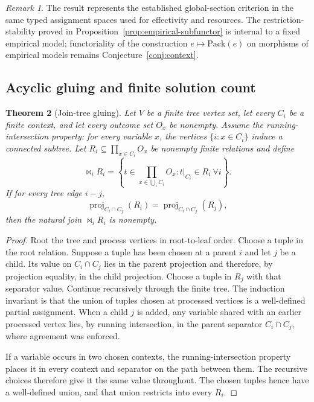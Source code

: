 \documentclass[11pt]{article}
\theoremstyle{plain}
\newtheorem{theorem}{Theorem}[section]
\theoremstyle{definition}
\theoremstyle{remark}
\newtheorem{remark}[theorem]{Remark}
\begin{document}
\begin{remark}
The result represents the established global-section criterion in the same typed
assignment spaces used for effectivity and resources. The restriction-stability
proved in Proposition~\ref{prop:empirical-subfunctor} is internal to a fixed empirical model; functoriality of the
construction $e\mapsto\mathrm{Pack}(e)$ on morphisms of empirical models remains
Conjecture~\ref{conj:context}.
\end{remark}

\subsection{Acyclic gluing and finite solution count}

\begin{theorem}[Join-tree gluing]\label{thm:jointree}
Let $V$ be a finite tree vertex set, let every $C_i$ be a finite context, and
let every outcome set $O_x$ be nonempty. Assume the running-intersection
property: for every variable $x$, the vertices $\{i:x\in C_i\}$ induce a
connected subtree. Let $R_i\subseteq\prod_{x\in C_i}O_x$ be nonempty finite
relations and define
\[
\Join_iR_i=
\left\{t\in\prod_{x\in\bigcup_iC_i}O_x:
 t|_{C_i}\in R_i\ \forall i\right\}.
\]
If for every tree edge $i{-}j$,
\[
\operatorname{proj}_{C_i\cap C_j}(R_i)
=
\operatorname{proj}_{C_i\cap C_j}(R_j),
\]
then the natural join $\Join_iR_i$ is nonempty.
\end{theorem}

\begin{proof}
Root the tree and process vertices in root-to-leaf order. Choose a tuple in the
root relation. Suppose a tuple has been chosen at a parent $i$ and let $j$ be a
child. Its value on
$C_i\cap C_j$ lies in the parent projection and therefore, by projection
equality, in the child projection. Choose a tuple in $R_j$ with that separator
value. Continue recursively through the finite tree. The induction invariant is that
the union of tuples chosen at processed vertices is a well-defined partial
assignment. When a child $j$ is added, any variable shared with an earlier
processed vertex lies, by running intersection, in the parent separator
$C_i\cap C_j$, where agreement was enforced.

If a variable occurs in two chosen contexts, the running-intersection property
places it in every context and separator on the path between them. The recursive
choices therefore give it the same value throughout. The chosen tuples hence
have a well-defined union, and that union restricts into every $R_i$.
\end{proof}
\end{document}
